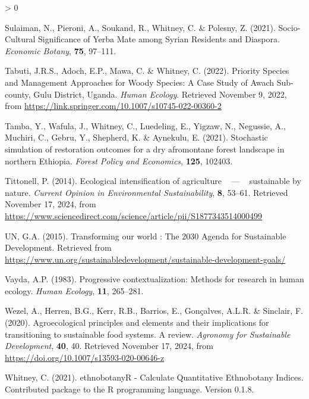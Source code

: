\documentclass[
]{article}
\newlength{\cslhangindent}
\newenvironment{CSLReferences}[2] %
 {%
  \setlength{\parindent}{0pt}
  \ifodd #1 \everypar{\setlength{\hangindent}{\cslhangindent}}\ignorespaces\fi
  \ifnum #2 > 0
  \setlength{\parskip}{#2\baselineskip}
  \fi
 }%
 {}
\begin{document}
\begin{CSLReferences}{1}{0}
\leavevmode{}%
Sulaiman, N., Pieroni, A., Soukand, R., Whitney, C. \& Polesny, Z.
(2021). Socio-{Cultural} {Significance} of {Yerba} {Mate} among {Syrian}
{Residents} and {Diaspora}. \emph{Economic Botany}, \textbf{75},
97--111.

\leavevmode{}%
Tabuti, J.R.S., Adoch, E.P., Mawa, C. \& Whitney, C. (2022). Priority
{Species} and {Management} {Approaches} for {Woody} {Species}: {A}
{Case} {Study} of {Awach} {Sub}-county, {Gulu} {District}, {Uganda}.
\emph{Human Ecology}. Retrieved November 9, 2022, from
\url{https://link.springer.com/10.1007/s10745-022-00360-2}

\leavevmode{}%
Tamba, Y., Wafula, J., Whitney, C., Luedeling, E., Yigzaw, N., Negussie,
A., Muchiri, C., Gebru, Y., Shepherd, K. \& Aynekulu, E. (2021).
Stochastic simulation of restoration outcomes for a dry afromontane
forest landscape in northern {Ethiopia}. \emph{Forest Policy and
Economics}, \textbf{125}, 102403.

\leavevmode{}%
Tittonell, P. (2014). Ecological intensification of agriculture ~ --- ~
sustainable by nature. \emph{Current Opinion in Environmental
Sustainability}, \textbf{8}, 53--61. Retrieved November 17, 2024, from
\url{https://www.sciencedirect.com/science/article/pii/S1877343514000499}

\leavevmode{}%
UN, G.A. (2015). Transforming our world : The 2030 {Agenda} for
{Sustainable} {Development}. Retrieved from
\url{https://www.un.org/sustainabledevelopment/sustainable-development-goals/}

\leavevmode{}%
Vayda, A.P. (1983). Progressive contextualization: {Methods} for
research in human ecology. \emph{Human Ecology}, \textbf{11}, 265--281.

\leavevmode{}%
Wezel, A., Herren, B.G., Kerr, R.B., Barrios, E., Gonçalves, A.L.R. \&
Sinclair, F. (2020). Agroecological principles and elements and their
implications for transitioning to sustainable food systems. {A} review.
\emph{Agronomy for Sustainable Development}, \textbf{40}, 40. Retrieved
November 17, 2024, from \url{https://doi.org/10.1007/s13593-020-00646-z}

\leavevmode{}%
Whitney, C. (2021). {ethnobotanyR} - {Calculate} {Quantitative}
{Ethnobotany} {Indices}. {Contributed} package to the {R} programming
language. {Version} 0.1.8.


\end{CSLReferences}
\end{document}
